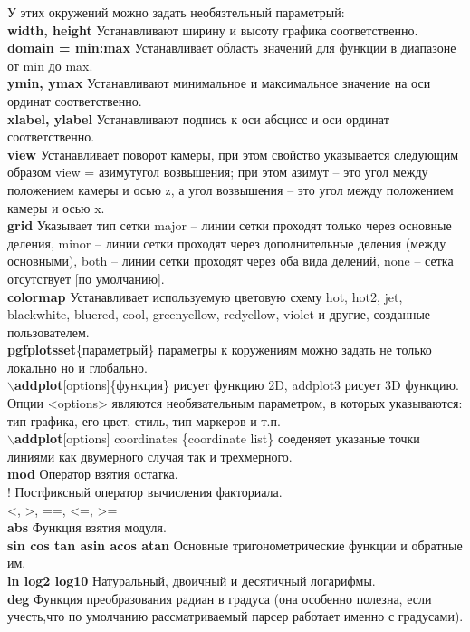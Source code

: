 \documentclass{article}
\newcommand{\bs}{$\backslash$}
\newcommand{\bd}[1]{{\bfseries #1}} %
\newcommand{\bb}[1]{\bd{\bs #1}} %
\begin{document}
{У этих окружений можно задать необязтельный параметрый:\\
\bd{width, height} Устанавливают ширину и высоту графика соответственно.\\
\bd{domain = min:max} Устанавливает область значений для функции
в диапазоне от min до max.\\
\bd{ymin, ymax} Устанавливают минимальное и максимальное значение
на оси ординат соответственно.\\
\bd{xlabel, ylabel} Устанавливают подпись к оси абсцисс
и оси ординат соответственно.\\
\bd{view} Устанавливает поворот камеры, при этом свойство указывается
следующим образом view = {азимут}{угол возвышения}; при этом
азимут – это угол между положением камеры и осью z,
а угол возвышения – это угол между положением камеры и осью x.\\
\bd{grid} Указывает тип сетки major – линии сетки проходят только
через основные деления, minor – линии сетки проходят через
дополнительные деления (между основными), both – линии сетки проходят
через оба вида делений, none – сетка отсутствует [по умолчанию].\\
\bd{colormap} Устанавливает используемую цветовую схему hot, hot2, jet,
blackwhite, bluered, cool, greenyellow, redyellow, violet
и другие, созданные пользователем.\\
\bd{pgfplotsset}\{параметрый\} параметры к коружениям можно задать не только
локально но и глобально.\\

\bb{addplot}[options]\{функция\} рисует функцию 2D, addplot3 рисует 3D функцию.
Опции <options> являются необязательным параметром, в которых указываются:
тип графика, его цвет, стиль, тип маркеров и т.п.\\
\bb{addplot}[options] coordinates \{coordinate list\} соеденяет указаные
точки линиями как двумерного случая так и трехмерного.\\

\bd{mod} Оператор взятия остатка.\\
! Постфиксный оператор вычисления факториала.\\
<, >, ==, <=, >=\\
\bd{abs} Функция взятия модуля.\\
\bd{sin cos tan asin acos atan} Основные тригонометрические функции
и обратные им.\\
\bd{ln log2 log10} Натуральный, двоичный и десятичный логарифмы.\\
\bd{deg} Функция преобразования радиан в градуса (она особенно полезна, если
учесть,что по умолчанию рассматриваемый парсер работает именно с градусами).\\

}
\end{document}
